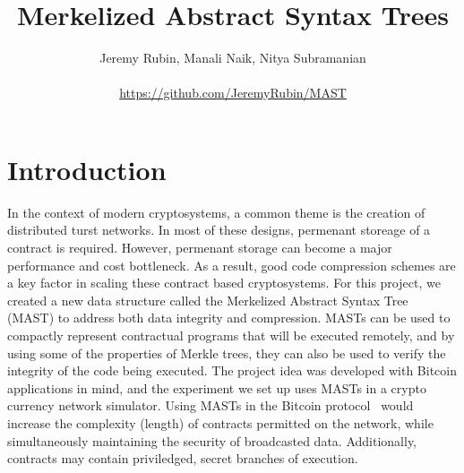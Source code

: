 \documentclass{vldb}
\begin{document}



\title{Merkelized Abstract Syntax Trees}




\author{
\alignauthor Jeremy Rubin, Manali Naik, Nitya Subramanian\\
\vspace{.2cm}
        \\
       \url{https://github.com/JeremyRubin/MAST}}

\maketitle

\section{Introduction}

In the context of modern cryptosystems, a common theme is the creation of
distributed turst networks. In most of these designs, permenant storeage of a
contract is required. However, permenant storage can become a major performance
and cost bottleneck. As a result, good code compression schemes are a key
factor in scaling these contract based cryptosystems. For this project, we
created a new data structure called the Merkelized Abstract Syntax Tree (MAST)
to address both data integrity and compression. MASTs can be used to compactly
represent contractual programs that will be executed remotely, and by using
some of the properties of Merkle trees, they can also be used to verify the
integrity of the code being executed. The project idea was developed with
Bitcoin applications in mind, and the experiment we set up uses MASTs in a
crypto currency network simulator. Using MASTs in the Bitcoin
protocol~\cite{bitcoin} would increase the complexity (length) of contracts
permitted on the network, while simultaneously maintaining the security of
broadcasted data. Additionally, contracts may contain priviledged, secret
branches of execution.
\end{document}
